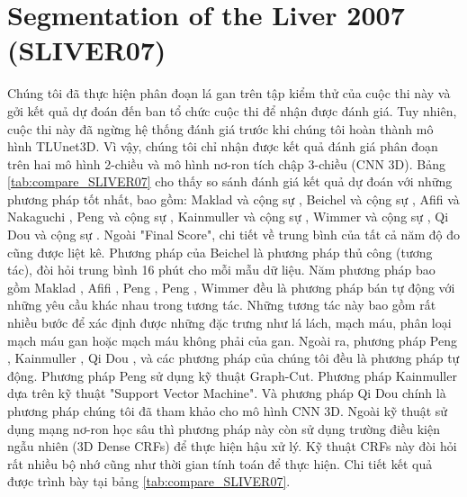 \section{Segmentation of the Liver 2007 (SLIVER07)}
Chúng tôi đã thực hiện phân đoạn lá gan trên tập kiểm thử của cuộc thi này và gởi kết quả dự đoán đến ban tổ chức cuộc thi để nhận được đánh giá. Tuy nhiên, cuộc thi này đã ngừng hệ thống đánh giá trước khi chúng tôi hoàn thành mô hình TLUnet3D. Vì vậy, chúng tôi chỉ nhận được kết quả đánh giá phân đoạn trên hai mô hình 2-chiều và mô hình nơ-ron tích chập 3-chiều (CNN 3D). Bảng \ref{tab:compare_SLIVER07} cho thấy so sánh đánh giá kết quả dự đoán với những phương pháp tốt nhất, bao gồm: Maklad và cộng sự \cite{Maklad_paper}, Beichel và cộng sự \cite{Beichel_paper}, Afifi và Nakaguchi \cite{Afifi_paper}, Peng và cộng sự \cite{Peng_paper} \cite{Peng_Wang_paper} \cite{Peng_Dong_paper}, Kainmuller và cộng sự \cite{Kainmuller_paper}, Wimmer và cộng sự \cite{Wimmer_paper}, Qi Dou và cộng sự \cite{dsn_paper}. Ngoài "Final Score", chi tiết về trung bình của tất cả năm độ đo cũng được liệt kê. Phương pháp của Beichel \cite{Beichel_paper} là phương pháp thủ công (tương tác), đòi hỏi trung bình 16 phút cho mỗi mẫu dữ liệu. Năm phương pháp bao gồm Maklad \cite{Maklad_paper}, Afifi \cite{Afifi_paper}, Peng \cite{Peng_Wang_paper}, Peng \cite{Peng_Dong_paper}, Wimmer \cite{Wimmer_paper} đều là phương pháp bán tự động với những yêu cầu khác nhau trong tương tác. Những tương tác này bao gồm rất nhiều bước để xác định được những đặc trưng như lá lách, mạch máu, phân loại mạch máu gan hoặc mạch máu không phải của gan. Ngoài ra, phương pháp  Peng \cite{Peng_paper}, Kainmuller \cite{Kainmuller_paper}, Qi Dou \cite{dsn_paper}, và các phương pháp của chúng tôi đều là phương pháp tự động. Phương pháp Peng \cite{Peng_paper} sử dụng kỹ thuật Graph-Cut. Phương pháp Kainmuller \cite{Kainmuller_paper} dựa trên kỹ thuật "Support Vector Machine". Và phương pháp Qi Dou \cite{dsn_paper} chính là phương pháp chúng tôi đã tham khảo cho mô hình CNN 3D. Ngoài kỹ thuật sử dụng mạng nơ-ron học sâu thì phương pháp này còn sử dụng trường điều kiện ngẫu nhiên (3D Dense CRFs) để thực hiện hậu xử lý. Kỹ thuật CRFs này đòi hỏi rất nhiều bộ nhớ cũng như thời gian tính toán để thực hiện. Chi tiết kết quả được trình bày tại bảng \ref{tab:compare_SLIVER07}.

